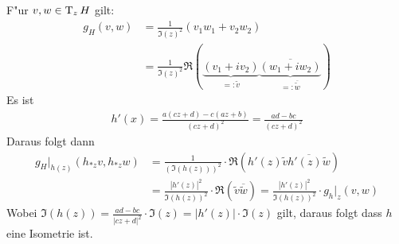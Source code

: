 \begin{emptythm}
F"ur $v, w \in \operatorname{T}_zH$ gilt:
\begin{align*}
	g_H(v, w) &= \frac{1}{\Im(z)^2} (v_1 w_1 + v_2 w_2) \\
	&= \frac{1}{\Im(z)^2} \Re(\underbrace{(v_1 + iv_2)}_{=: \tilde{v}} \overline{\underbrace{(w_1 + i w_2)}_{=:\overline{\tilde{w}}}})
\end{align*}
Es ist
\begin{align*}
	h'(x) = \frac{a(cz + d) - c(az + b)}{(cz + d)^2} = \frac{ad - bc}{(cz + d)^2}
\end{align*}
Daraus folgt dann
\begin{align*}
	g_H|_{h(z)}(h_{*z}v, h_{*z}w) &= \frac{1}{(\Im(h(z)))^2} \cdot \Re(h'(z) \tilde{v} \overline{h'(z) \tilde{w}}) \\
	&= \frac{|h'(z)|^2}{\Im(h(z))^2} \cdot \Re(\tilde{v} \overline{\tilde{w}}) = \frac{|h'(z)|^2}{\Im(h(z))^2} \cdot g_h|_z(v,w)
\end{align*}
Wobei $\Im(h(z)) = \frac{ad - bc}{|cz + d|^2} \cdot \Im(z) = |h'(z)| \cdot \Im(z)$ gilt, daraus folgt dass $h$ eine Isometrie ist.
\end{emptythm}

